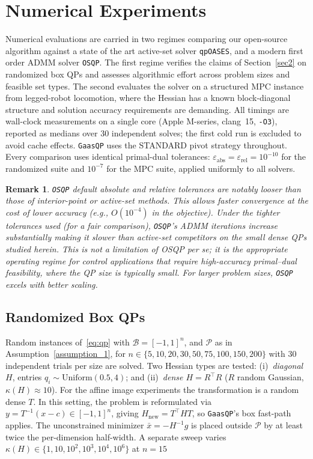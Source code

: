 \documentclass[pdflatex,sn-mathphys-num]{sn-jnl}%
\theoremstyle{thmstyleone}%
\theoremstyle{thmstyletwo}%
\newtheorem{remark}{Remark}%
\theoremstyle{thmstylethree}%
\theoremstyle{thmstylethree}%
\newcommand{\Pset}{\mathcal{P}}
\begin{document}
\section{Numerical Experiments}\label{sec:benchmarks}

Numerical evaluations are carried in two regimes comparing our open-source algorithm against a state of the art active-set solver \texttt{qpOASES}\cite{qpoases}, and a modern first order ADMM solver \texttt{OSQP}\cite{osqp}. The first regime verifies the claims of Section~\ref{sec2} on randomized box QPs and assesses algorithmic effort across problem sizes and feasible set types.
The second evaluates the solver on a structured MPC instance from
legged-robot locomotion, where the Hessian has a known block-diagonal structure and solution accuracy requirements are demanding.
All timings are wall-clock measurements on a single core (Apple M-series, clang~15, \texttt{-O3}), reported as medians over 30 independent solves; the first cold run is excluded to avoid cache effects. \texttt{GaasQP} uses the \textsc{STANDARD} pivot strategy throughout. Every comparison uses identical primal-dual tolerances: $\varepsilon_{\text{abs}}
= \varepsilon_{\text{rel}} = 10^{-10}$ for the randomized suite and $10^{-7}$ for the MPC suite, applied uniformly to all solvers.

\begin{remark}
\texttt{OSQP} default absolute and
relative tolerances are notably looser than those of interior-point or active-set methods. This allows faster convergence at the cost of lower accuracy (e.g., $O(10^{-4})$ in the
objective). Under the tighter tolerances used (for a fair comparison), \texttt{OSQP}'s ADMM iterations increase substantially making it slower than active-set competitors on the small dense QPs
studied herein.
This is not a limitation of OSQP per se; it is the appropriate operating regime for control applications that require high-accuracy primal--dual
feasibility, where the QP size is typically small. For larger problem sizes, \texttt{OSQP} excels with better scaling.
\end{remark}


\subsection{Randomized Box QPs}\label{sec:bench_random}

Random instances of~\eqref{eq:qp} with $\mathcal{B}=[-1,1]^n$, and $\Pset$ as in Assumption~\ref{assumption_1}, 
for $n\in\{5,10,20,30,50,75,100,150,200\}$ 
with 30 independent trials per size
are solved.
Two Hessian types are tested: (i)~\emph{diagonal $H$}, entries
$q_i\sim\mathrm{Uniform}(0.5,4)$; and (ii)~\emph{dense $H=R^\top R$}
($R$ random Gaussian, $\kappa(H)\approx10$).
For the affine image experiments the transformation is a random
dense $T$.
In this setting, the problem is reformulated via $y=T^{-1}(x-c)\in[-1,1]^n$,
giving $H_{\mathrm{new}}=T^\top HT$, so \texttt{GaasQP}'s box fast-path applies.
The unconstrained minimizer $\bar{x}=-H^{-1}g$ is placed outside $\mathcal{P}$
by at least twice the per-dimension half-width.
A separate sweep varies $\kappa(H)\in\{1,10,10^2,10^3,10^4,10^6\}$ at $n=15$
\end{document}
